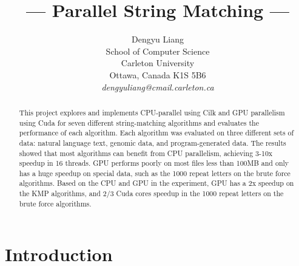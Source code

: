 \documentclass[11pt]{article}       %
\begin{document}


\title{--- Parallel String Matching ---}


\author{
Dengyu Liang\\
School of Computer Science\\
Carleton University\\
Ottawa, Canada K1S 5B6\\
{\em dengyuliang@cmail.carleton.ca}
} %

\maketitle

\begin{abstract}
This project explores and implements CPU-parallel using Cilk and GPU parallelism using Cuda for seven different string-matching algorithms and evaluates the performance of each algorithm. Each algorithm was evaluated on three different sets of data: natural language text, genomic data, and program-generated data. The results showed that most algorithms can benefit from CPU parallelism, achieving 3-10x speedup in 16 threads. GPU performs poorly on most files less than 100MB and only has a huge speedup on special data, such as the 1000 repeat letters on the brute force algorithms.  Based on the CPU and GPU in the experiment, GPU has a 2x speedup on the KMP algorithms, and 2/3 Cuda cores speedup in the 1000 repeat letters on the brute force algorithms. 

\end{abstract}


\section{Introduction} \label{intro}
\end{document}
